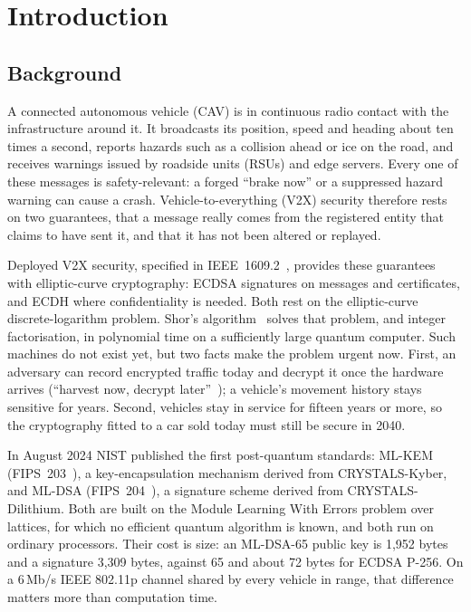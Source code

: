 \chapter{Introduction}
\label{ch:intro}

\section{Background}

A connected autonomous vehicle (CAV) is in continuous radio contact with the
infrastructure around it. It broadcasts its position, speed and heading about
ten times a second, reports hazards such as a collision ahead or ice on the
road, and receives warnings issued by roadside units (RSUs) and edge servers.
Every one of these messages is safety-relevant: a forged ``brake now'' or a
suppressed hazard warning can cause a crash. Vehicle-to-everything (V2X)
security therefore rests on two guarantees, that a message really comes from
the registered entity that claims to have sent it, and that it has not been
altered or replayed.

Deployed V2X security, specified in IEEE~1609.2~\cite{ieee16092}, provides
these guarantees with elliptic-curve cryptography: ECDSA signatures on
messages and certificates, and ECDH where confidentiality is needed. Both
rest on the elliptic-curve discrete-logarithm problem. Shor's
algorithm~\cite{shor} solves that problem, and integer factorisation, in
polynomial time on a sufficiently large quantum computer. Such machines do not
exist yet, but two facts make the problem urgent now. First, an adversary can
record encrypted traffic today and decrypt it once the hardware arrives
(``harvest now, decrypt later''~\cite{mosca}); a vehicle's movement history
stays sensitive for years. Second, vehicles stay in service for fifteen years
or more, so the cryptography fitted to a car sold today must still be secure
in 2040.

In August 2024 NIST published the first post-quantum standards: ML-KEM
(FIPS~203~\cite{fips203}), a key-encapsulation mechanism derived from
CRYSTALS-Kyber, and ML-DSA (FIPS~204~\cite{fips204}), a signature scheme
derived from CRYSTALS-Dilithium. Both are built on the Module Learning With
Errors problem over lattices, for which no efficient quantum algorithm is
known, and both run on ordinary processors. Their cost is size: an ML-DSA-65
public key is 1,952 bytes and a signature 3,309 bytes, against 65 and about
72 bytes for ECDSA P-256. On a 6\,Mb/s IEEE 802.11p channel shared by every
vehicle in range, that difference matters more than computation time.


